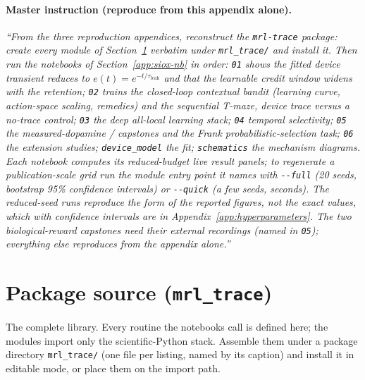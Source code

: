 \paragraph{Master instruction (reproduce from this appendix alone).}
\emph{``From the three reproduction appendices, reconstruct the
\texttt{mrl-trace} package: create every module of Section~\ref{app:siox-src}
verbatim under \texttt{mrl\_trace/} and install it. Then run the notebooks of
Section~\ref{app:siox-nb} in order: \texttt{01} shows the fitted device transient reduces to
$e(t)=e^{-t/\tau_{\mathrm{leak}}}$ and that the learnable credit window widens with the
retention; \texttt{02} trains the closed-loop contextual bandit (learning curve, action-space
scaling, remedies) and the sequential T-maze, device trace versus a no-trace control;
\texttt{03} the deep all-local learning stack; \texttt{04} temporal selectivity; \texttt{05}
the measured-dopamine /  capstones and the Frank probabilistic-selection task;
\texttt{06} the extension studies; \texttt{device\_model} the
 fit; \texttt{schematics} the mechanism diagrams. Each
notebook computes its reduced-budget live result panels; to regenerate a publication-scale grid run
the module entry point it names with \texttt{-{}-full} (20 seeds, bootstrap 95\% confidence
intervals) or \texttt{-{}-quick} (a few seeds, seconds). The reduced-seed runs reproduce the
form of the reported figures, not the exact values, which with confidence intervals are in
Appendix~\ref{app:hyperparameters}. The two biological-reward capstones need their external
recordings (named in \texttt{05}); everything else reproduces from the appendix alone.''}

\section{Package source (\texttt{mrl\_trace})}
\label{app:siox-src}

\noindent The complete library. Every routine the notebooks call is defined here; the modules import only the scientific-Python stack. Assemble them under a package directory \texttt{mrl\_trace/} (one file per listing, named by its caption) and install it in editable mode, or place them on the import path.

